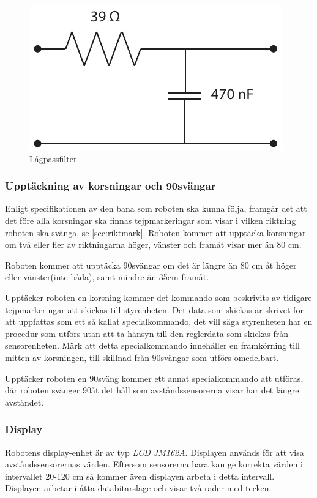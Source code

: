 \begin{figure}[H]
  \centering
 \includegraphics[angle=0,scale=0.7]{bilder/LPfilter.pdf}
  \caption{Lågpassfilter}
  \label{fig:lagpassfilter}
\end{figure}


\subsubsection{Upptäckning av korsningar och 90\degree svängar}
\label{sec:upptackkorsning}
Enligt specifikationen av den bana som roboten ska kunna följa, framgår det 
att det före alla korsningar ska finnas tejpmarkeringar som visar i vilken 
riktning roboten ska svänga, se \ref{sec:riktmark}. Roboten kommer att 
upptäcka korsningar om två eller fler av riktningarna höger, vänster och framåt visar 
mer än 80 cm.

Roboten kommer att upptäcka 90\degree svängar om det är längre än 80 cm åt 
höger eller vänster(inte båda), samt mindre än 35cm framåt.

Upptäcker roboten en korsning kommer det kommando som beskrivits av tidigare 
tejpmarkeringar att skickas till styrenheten. Det data som skickas är skrivet 
för att uppfattas som ett så kallat specialkommando, det vill säga 
styrenheten har en procedur som utförs utan att ta hänsyn till den reglerdata 
som skickas från sensorenheten. Märk att detta specialkommando innehåller en 
framkörning till mitten av korsningen, till skillnad från 90\degree svängar 
som utförs omedelbart.

Upptäcker roboten en 90\degree sväng kommer ett annat specialkommando att 
utföras, där roboten svänger 90\degree åt det håll som avståndssensorerna 
visar har det längre avståndet.


\subsubsection{Display}
Robotens display-enhet är av typ \emph{LCD JM162A}. Displayen används för att 
visa avståndssensorernas värden. Eftersom sensorerna bara kan ge korrekta 
värden i intervallet 20-120 cm så kommer även displayen arbeta i detta 
intervall. Displayen arbetar i åtta databitarsläge och visar två rader med 
tecken. 

